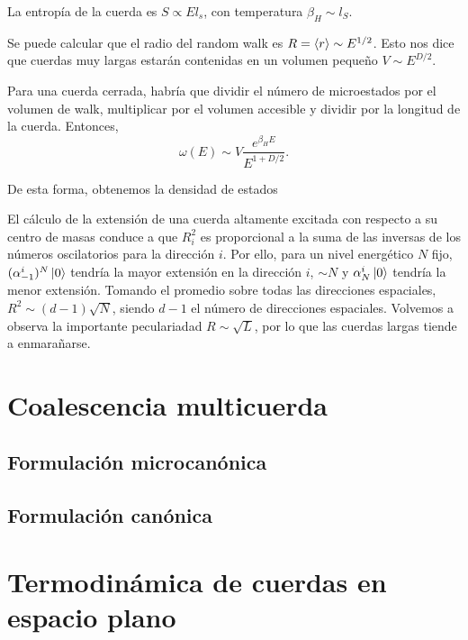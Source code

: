 La entropía de la cuerda es $S\propto El_s$, con temperatura $\beta_H\sim l_S$.

Se puede calcular que el radio del random walk es $R=\expval{r}\sim E^{1/2}$. Esto
nos dice que cuerdas muy largas estarán contenidas en un volumen pequeño $V\sim E^{D/2}$.

Para una cuerda cerrada, habría que dividir el número de microestados por el 
volumen de walk, multiplicar por el volumen accesible y dividir por la longitud de la cuerda.
Entonces,
\begin{equation}
  \omega(E)\sim V \frac{e^{\beta_H E}}{E^{1+D/2}}.
\end{equation}

De esta forma, obtenemos la densidad de estados 

El cálculo de la extensión de una cuerda altamente excitada con respecto a su centro de masas 
conduce a que $R^2_i$ es proporcional a la suma de las inversas de los números oscilatorios para
la dirección $i$.
Por ello, para un nivel energético $N$ fijo, $(\alpha^i_{-1})^N\ket{0}$ tendría la mayor extensión en la dirección $i$, $\sim N$ y
$\alpha^i_N\ket{0}$ tendría la menor extensión.
Tomando el promedio sobre todas las direcciones espaciales, $R^2\sim (d-1)\sqrt{N}$, siendo
$d-1$ el número de direcciones espaciales. Volvemos a  observa la importante peculariadad $R\sim \sqrt{L}$,
por lo que las cuerdas largas tiende a enmarañarse.

\section{Coalescencia multicuerda}


\subsection{Formulación microcanónica}


\subsection{Formulación canónica}

\section{Termodinámica de cuerdas en espacio plano}

